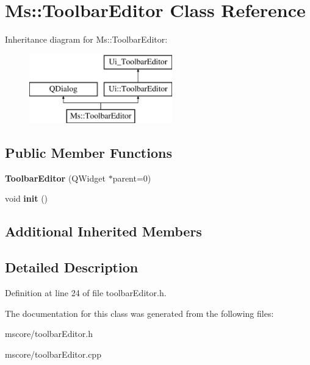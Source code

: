 \hypertarget{class_ms_1_1_toolbar_editor}{}\section{Ms\+:\+:Toolbar\+Editor Class Reference}
\label{class_ms_1_1_toolbar_editor}
Inheritance diagram for Ms\+:\+:Toolbar\+Editor\+:\begin{figure}[H]
\begin{center}
\leavevmode
\includegraphics[height=3.000000cm]{class_ms_1_1_toolbar_editor}
\end{center}
\end{figure}
\subsection*{Public Member Functions}
\begin{DoxyCompactItemize}
\item 
\mbox{\label{class_ms_1_1_toolbar_editor_a1e58b130a8a3f8034342f79aab6e129d}} 
{\bfseries Toolbar\+Editor} (Q\+Widget $\ast$parent=0)
\item 
\mbox{\label{class_ms_1_1_toolbar_editor_a6aca2a0c3e9896f48283814a1ee7e05c}} 
void {\bfseries init} ()
\end{DoxyCompactItemize}
\subsection*{Additional Inherited Members}


\subsection{Detailed Description}


Definition at line 24 of file toolbar\+Editor.\+h.



The documentation for this class was generated from the following files\+:\begin{DoxyCompactItemize}
\item 
mscore/toolbar\+Editor.\+h\item 
mscore/toolbar\+Editor.\+cpp\end{DoxyCompactItemize}
